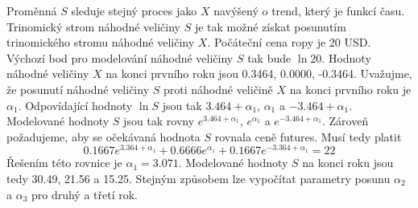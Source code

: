 \documentclass[a4paper]{book}
\begin{document}
Proměnná $S$ sleduje stejný proces jako $X$ navýšený o trend, který je funkcí času. Trinomický strom náhodné veličiny $S$ je tak možné získat posunutím trinomického stromu náhodné veličiny $X$. Počáteční cena ropy je 20 USD. Výchozí bod pro modelování náhodné veličiny $S$ tak bude $\ln 20$. Hodnoty náhodné veličiny $X$ na konci prvního roku jsou 0.3464, 0.0000, -0.3464. Uvažujme, že posunutí náhodné veličiny $S$ proti náhodné veličině $X$ na konci prvního roku je $\alpha_1$. Odpovídající hodnoty $\ln S$ jsou tak $3.464 + \alpha_1$, $\alpha_1$ a $-3.464 + \alpha_1$. Modelované hodnoty $S$ jsou tak rovny $e^{3.464 + \alpha_1}$, $e^{\alpha_1}$ a $e^{-3.464 + \alpha_1}$. Zároveň požadujeme, aby se očekávaná hodnota $S$ rovnala ceně futures. Musí tedy platit
\begin{equation*}
0.1667 e^{3.364 + \alpha_1} + 0.6666 e^{\alpha_1} + 0.1667 e^{-3.364 + \alpha_1} = 22
\end{equation*}
Řešením této rovnice je $\alpha_1 = 3.071$. Modelované hodnoty $S$ na konci roku jsou tedy 30.49, 21.56 a 15.25. Stejným způsobem lze vypočítat parametry posunu $\alpha_2$ a $\alpha_3$ pro druhý a třetí rok.
\end{document}
